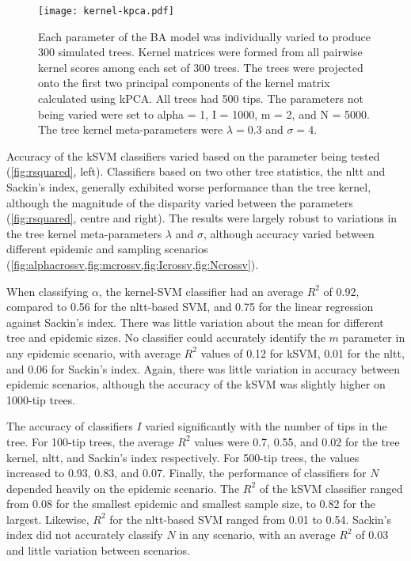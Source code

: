 \begin{figure}[ht]
  \centering
  \texttt{[image: kernel-kpca.pdf]}
  \caption[\gls{kPCA} projections of simulated trees under varying \gls{BA}
           parameter values]{
    Each parameter of the \gls{BA} model was individually varied to produce 300
    simulated trees. Kernel matrices were formed from all pairwise kernel
    scores among each set of 300 trees. The trees were projected onto the first
    two principal components of the kernel matrix calculated using \gls{kPCA}.
    All trees had 500 tips. The parameters not being varied were set to
    \gls{alpha} = 1, \gls{I} = 1000, \gls{m} = 2, and \gls{N} = 5000. The tree
    kernel meta-parameters were $\lambda = 0.3$ and $\sigma = 4$.
  }
  \label{fig:kpca}
\end{figure}



Accuracy of the \gls{kSVM} classifiers varied based on the parameter being
tested (\cref{fig:rsquared}, left). Classifiers based on two other tree
statistics, the \gls{nltt} and Sackin's index, generally exhibited worse
performance than the tree kernel, although the magnitude of the disparity
varied between the parameters (\cref{fig:rsquared}, centre and right). The
results were largely robust to variations in the tree kernel meta-parameters
$\lambda$ and $\sigma$, although accuracy varied between different epidemic and
sampling scenarios
(\cref{fig:alphacrossv,fig:mcrossv,fig:Icrossv,fig:Ncrossv}).

When classifying $\alpha$, the kernel-SVM classifier had an average $R^2$ of 
    0.92,
compared to 
    0.56
for the \gls{nltt}-based SVM, and
    0.75
for the linear regression against Sackin's index. There was little variation
about the mean for different tree and epidemic sizes. No classifier could
accurately identify the $m$ parameter in any epidemic scenario, with average
$R^2$ values of 
  0.12 for \gls{kSVM},
  0.01 for the \gls{nltt}, and
  0.06
for Sackin's index. Again, there was little variation in accuracy between
epidemic scenarios, although the accuracy of the \gls{kSVM} was slightly higher
on 1000-tip trees.

The accuracy of classifiers $I$ varied significantly with the number of tips in
the tree. For 100-tip trees, the average $R^2$ values were
  0.7,
  0.55, and
  0.02
for the tree kernel, \gls{nltt}, and Sackin's index respectively. For 500-tip
trees, the values increased to
  0.93,
  0.83, and
  0.07.
Finally, the performance of classifiers for $N$ depended heavily on the
epidemic scenario. The $R^2$ of the \gls{kSVM} classifier ranged from
  0.08
for the smallest epidemic and smallest sample size, to
  0.82
for the largest. Likewise, $R^2$ for the \gls{nltt}-based SVM ranged from 
  0.01
to
  0.54.
Sackin's index did not accurately classify $N$ in any scenario, with an average
$R^2$ of
  0.03
and little variation between scenarios.

